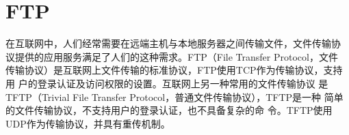 \chapter{FTP}
\label{chap:FTP}

在互联网中，人们经常需要在远端主机与本地服务器之间传输文件，文件传输协
议提供的应用服务满足了人们的这种需求。FTP（File Transfer Protocol，文件
传输协议）是互联网上文件传输的标准协议，FTP使用TCP作为传输协议，支持用
户的登录认证及访问权限的设置。互联网上另一种常用的文件传输协议
是TFTP（Trivial File Transfer Protocol，普通文件传输协议），TFTP是一种
简单的文件传输协议，不支持用户的登录认证，也不具备复杂的命
令。TFTP使用UDP作为传输协议，并具有重传机制。

